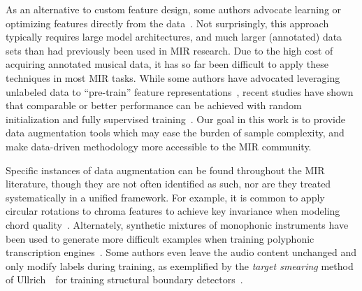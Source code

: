 \documentclass{article}
\begin{document}
%
%
%
As an alternative to custom feature design, some authors advocate learning or optimizing
features directly from the data~\cite{humphrey2012moving}.
Not surprisingly, this approach typically requires large model architectures, and
much larger (annotated) data sets than had previously been used in MIR research.  
Due to the high cost of acquiring annotated musical data, it has so far been difficult to
apply these techniques in most MIR tasks.
While some authors have advocated leveraging unlabeled data to ``pre-train'' feature
representations~\cite{dieleman2011audio}, 
recent studies have shown that comparable or better performance can be
achieved with random initialization and fully supervised training~\cite{glorot2011deep,zeiler2013rectified}.
Our goal in this work is to provide data augmentation tools which may ease the burden of 
sample complexity, and make data-driven methodology more accessible to the MIR community.

%
Specific instances of data augmentation can be found throughout the MIR literature,
though they are not often identified as such, nor are they treated systematically 
in a unified framework.
For example, it is common to apply circular rotations to chroma features
to achieve key invariance when modeling chord quality~\cite{lee2008acoustic}.
Alternately, synthetic mixtures of monophonic instruments have been used
to generate more difficult examples when training polyphonic transcription
engines~\cite{kirchhoff2012multi}.
Some authors even leave the audio content unchanged and only modify labels during training, as exemplified by the \emph{target smearing}
method of Ullrich~\etal\ for training structural boundary
detectors~\cite{ullrich2014boundary}.
\end{document}
